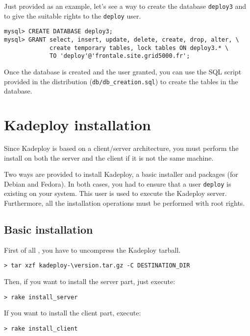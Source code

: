 \documentclass[a4wide,10pt,oneside]{book}
\newcommand{\version}{3.1.7}
\begin{document}
Just provided as an example, let's see a way to create the database \texttt{deploy3} and to give the suitable rights to the \texttt{deploy} user.
\begin{verbatim}
mysql> CREATE DATABASE deploy3;
mysql> GRANT select, insert, update, delete, create, drop, alter, \
             create temporary tables, lock tables ON deploy3.* \
             TO 'deploy'@'frontale.site.grid5000.fr';
\end{verbatim}

Once the database is created and the user granted, you can use the SQL script provided in the distribution (\texttt{db/db\_creation.sql}) to create the tables in the database.

\section{Kadeploy installation}
Since Kadeploy is based on a client/server architecture, you must perform the install on both the server and the client if it is not the same machine.

Two ways are provided to install Kadeploy, a basic installer and packages (for Debian and Fedora). In both cases, you had to ensure that a user \texttt{deploy} is existing on your system. This user is used to execute the Kadeploy server. Furthermore, all the installation operations must be performed with root rights.

\subsection{Basic installation}
First of all , you have to uncompress the Kadeploy tarball.
\begin{small}
\begin{Verbatim}[commandchars=\\\{\}]
> tar xzf kadeploy-\version.tar.gz -C DESTINATION_DIR
\end{Verbatim}
\end{small}

\noindent Then, if you want to install the server part, just execute:
\begin{small}
\begin{verbatim}
> rake install_server
\end{verbatim}
\end{small}

\noindent If you want to install the client part, execute:
\begin{small}
\begin{verbatim}
> rake install_client
\end{verbatim}
\end{small}
\end{document}
